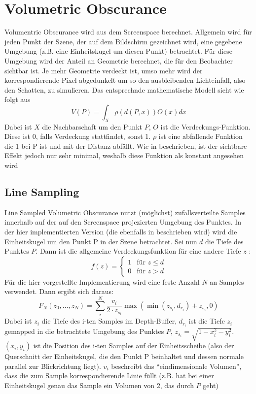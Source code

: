 \documentclass[runningheaders,a4paper]{llncs}
\begin{document}
\section{Volumetric Obscurance}

Volumentric Obscurance wird aus dem Screenspace berechnet. Allgemein wird für jeden Punkt der Szene, der auf
dem Bildschirm gezeichnet wird, eine gegebene Umgebung (z.B. eine Einheitskugel um diesen Punkt) betrachtet.
Für diese Umgebung wird der Anteil an Geometrie berechnet, die für den Beobachter sichtbar ist. Je mehr Geometrie
verdeckt ist, umso mehr wird der korrespondierende Pixel abgedunkelt um so den ausbleibenden Lichteinfall,
also den Schatten, zu simulieren.
Das entsprechnde mathematische Modell sieht wie folgt aus \cite{voPaper}
$$
V(P) = \int_{X} \rho (d(P,x))O(x)dx
$$
Dabei ist $X$ die Nachbarschaft um den Punkt $P$, $O$ ist die Verdeckungs-Funktion. Diese
ist 0, falls Verdeckung stattfindet, sonst 1. $\rho$ ist eine abfallende Funktion
die 1 bei P ist und mit der Distanz abfällt. Wie in \cite{voPaper} beschrieben, ist der 
sichtbare Effekt jedoch nur sehr minimal, weshalb diese Funktion als konstant angesehen 
wird \cite{voPaper}

\subsection{Line Sampling}
Line Sampled Volumetric Obscurance nutzt (möglichst) zufallsverteilte Samples innerhalb auf der auf den
Screenspace projezierten Umgebung des Punktes. In der hier implementierten Version (die ebenfalls in
\cite{voPaper} beschrieben wird) wird die Einheitskugel um den Punkt P in der Szene betrachtet.
Sei nun $d$ die Tiefe des Punktes $P$. Dann ist die allgemeine Verdeckungsfunktion für eine andere Tiefe
$z$ :
$$
f(z) = \begin{cases} 1 &  \text{für } z \leq d \\ 0 & \text{für } z > d \end{cases}
$$
Für die hier vorgestellte Implementierung wird eine feste Anzahl $N$ an Samples verwendet.
Dann ergibt sich daraus:
$$
F_{N}(z_0, \dots, z_N) = \sum_i^N \frac{v_i}{2 \cdot z_{s_i}} \max{(\min{(z_{s_i}, d_{r_i})} + z_{s_i}, 0)}
$$
Dabei ist $z_i$ die Tiefe des i-ten Samples im Depth-Buffer, $d_{r_i}$ ist die Tiefe $z_i$ gemapped in die
betrachtete Umgebung des Punktes $P$, $z_{s_i} = \sqrt{1 - x_i^2 - y_i^2}$. $(x_i, y_i)$ ist die Position des
i-ten Samples auf der Einheitsscheibe (also der Querschnitt der Einheitskugel, die den Punkt P 
beinhaltet und dessen normale parallel zur Blickrichtung liegt). $v_i$ beschreibt das ``eindimensionale
Volumen'', dass die zum Sample korrespondierende Linie füllt (z.B. hat bei einer Einheitskugel genau das Sample
ein Volumen von 2, das durch $P$ geht) \newline
\end{document}
